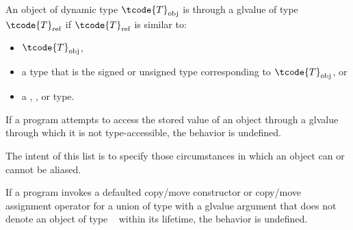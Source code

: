 \pnum
An object of dynamic type $\tcode{T}_\text{obj}$ is
 through a glvalue of type $\tcode{T}_\text{ref}$
if $\tcode{T}_\text{ref}$ is similar to:
\begin{itemize}
\item $\tcode{T}_\text{obj}$,

\item a type that is the signed or unsigned type corresponding to $\tcode{T}_\text{obj}$, or

\item a , , or  type.
\end{itemize}
If a program attempts to access
the stored value of an object through a glvalue
through which it is not type-accessible,
the behavior is undefined.
%
%
%
%
%
\begin{footnote}
The intent of this list is to specify those circumstances in which an
object can or cannot be aliased.
\end{footnote}
If a program invokes
a defaulted copy/move constructor or copy/move assignment operator
for a union of type  with a glvalue argument
that does not denote an object of type \cv{}~ within its lifetime,
the behavior is undefined.

